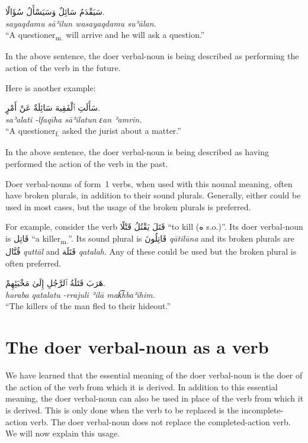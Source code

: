 \documentclass[
  10pt,
]{book}
\begin{document}
\foreignlanguage{arabic}{سَيَقْدَمُ سَائِلٌ وَسَيَسْأَلُ سُؤَالًا.}\\
\emph{sayaqdamu sāʾilun wasayaqdamu suʾālan.}\\
\enquote{A questioner\textsubscript{m.} will arrive and he will ask a question.}

In the above sentence, the doer verbal-noun is being described as performing the action of the verb in the future.

Here is another example:

\foreignlanguage{arabic}{سَأَلَتِ ٱلْفَقِيهَ سَائِلَةٌ عَنْ أَمْرٍ.}\\
\emph{saʾalati -lfaqīha sāʾilatun ɛan ʾamrin.}\\
\enquote{A questioner\textsubscript{f.} asked the jurist about a matter.}

In the above sentence, the doer verbal-noun is being described as having performed the action of the verb in the past.

Doer verbal-nouns of form~1 verbs, when used with this nounal meaning, often have broken plurals, in addition to their sound plurals. Generally, either could be used in most cases, but the usage of the broken plurals is preferred.

For example, consider the verb \foreignlanguage{arabic}{قَتَلَ يَقْتُلُ قَتْلًا} \enquote{to kill (\foreignlanguage{arabic}{ه} s.o.)}. Its doer verbal-noun is \foreignlanguage{arabic}{قَاتِل} \enquote{a killer\textsubscript{m.}}. Its sound plural is \foreignlanguage{arabic}{قَاتِلُونَ} \emph{qātilūna} and its broken plurals are \foreignlanguage{arabic}{قُتَّال} \emph{quttāl} and \foreignlanguage{arabic}{قَتَلَة} \emph{qatalah}. Any of these could be used but the broken plural is often preferred.

\foreignlanguage{arabic}{هَرَبَ قَتَلَةُ ٱلرَّجُلِ إِلَىٰ مَخْبَئِهِمْ.}\\
\emph{haraba qatalatu -rrajuli ʾilā mak͡hbaʾihim.}\\
\enquote{The killers of the man fled to their hideout.}

\section{The doer verbal-noun as a verb}\label{the-doer-verbal-noun-as-a-verb}

We have learned that the essential meaning of the doer verbal-noun is the doer of the action of the verb from which it is derived. In addition to this essential meaning, the doer verbal-noun can also be used in place of the verb from which it is derived. This is only done when the verb to be replaced is the incomplete-action verb. The doer verbal-noun does not replace the completed-action verb. We will now explain this usage.
\end{document}
